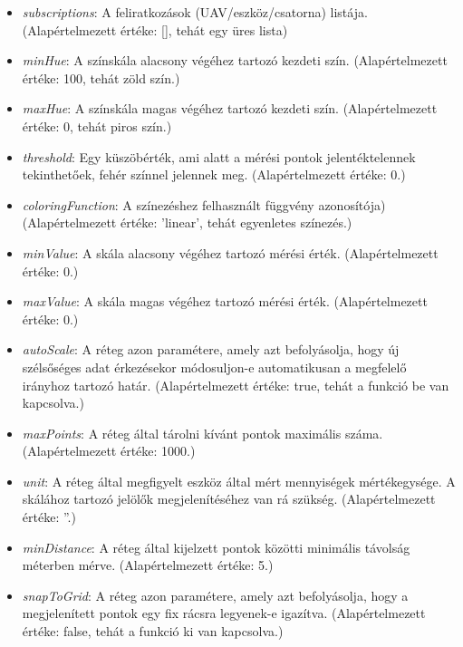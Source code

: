 \begin{itemize}
  \begin{itemize}
  \item \textit{subscriptions}:
    A feliratkozások (UAV/eszköz/csatorna) listája.
    (Alapértelmezett értéke: [], tehát egy üres lista)
  \item \textit{minHue}:
    A színskála alacsony végéhez tartozó kezdeti szín.
    (Alapértelmezett értéke: 100, tehát zöld szín.)
  \item \textit{maxHue}:
    A színskála magas végéhez tartozó kezdeti szín.
    (Alapértelmezett értéke: 0, tehát piros szín.)
  \item \textit{threshold}:
    Egy küszöbérték, ami alatt a mérési pontok jelentéktelennek tekinthetőek,
    fehér színnel jelennek meg.
    (Alapértelmezett értéke: 0.)
  \item \textit{coloringFunction}:
    A színezéshez felhasznált függvény azonosítója)
    (Alapértelmezett értéke: 'linear', tehát egyenletes színezés.)
  \item \textit{minValue}:
    A skála alacsony végéhez tartozó mérési érték.
    (Alapértelmezett értéke: 0.)
  \item \textit{maxValue}:
    A skála magas végéhez tartozó mérési érték.
    (Alapértelmezett értéke: 0.)
  \item \textit{autoScale}:
    A réteg azon paramétere, amely azt befolyásolja, hogy új szélsőséges adat
    érkezésekor módosuljon-e automatikusan a megfelelő irányhoz tartozó határ.
    (Alapértelmezett értéke: true, tehát a funkció be van kapcsolva.)
  \item \textit{maxPoints}:
    A réteg által tárolni kívánt pontok maximális száma.
    (Alapértelmezett értéke: 1000.)
  \item \textit{unit}:
    A réteg által megfigyelt eszköz által mért mennyiségek mértékegysége.
    A skálához tartozó jelölők megjelenítéséhez van rá szükség.
    (Alapértelmezett értéke: ''.)
  \item \textit{minDistance}:
    A réteg által kijelzett pontok közötti minimális távolság méterben mérve.
    (Alapértelmezett értéke: 5.)
  \item \textit{snapToGrid}:
    A réteg azon paramétere, amely azt befolyásolja, hogy a megjelenített pontok
    egy fix rácsra legyenek-e igazítva.
    (Alapértelmezett értéke: false, tehát a funkció ki van kapcsolva.)
  \end{itemize}

\end{itemize}


